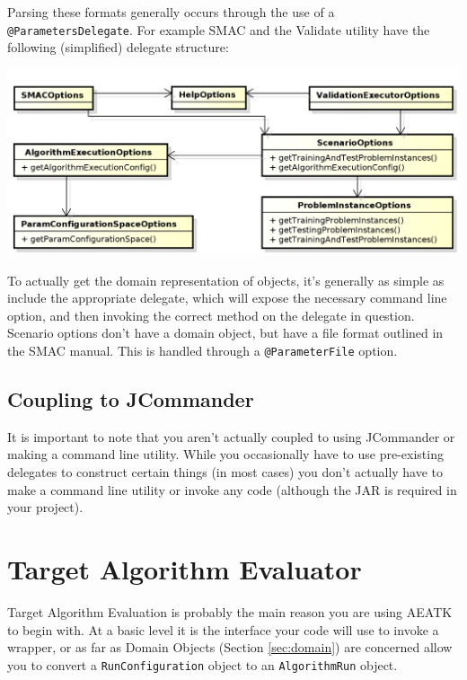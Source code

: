 \documentclass[11pt,letterpaper,oneside]{article}
\begin{document}
Parsing these formats generally occurs through the use of a \texttt{@ParametersDelegate}. For example SMAC and the Validate utility have the following (simplified) delegate structure:

\begin{center}
\includegraphics[scale=0.75]{img/UML/Options2.png}
\end{center}


To actually get the domain representation of objects, it's generally as simple as include the appropriate delegate, which will expose the necessary command line option, and then invoking the correct method on the delegate in question. Scenario options don't have a domain object, but have a file format outlined in the SMAC manual. This is handled through a \texttt{@ParameterFile} option.

\subsection{Coupling to JCommander}

It is important to note that you aren't actually coupled to using JCommander or making a command line utility. While you occasionally have to use pre-existing delegates to construct certain things (in most cases) you don't actually have to make a command line utility or invoke any code (although the JAR is required in your project).


\section{Target Algorithm Evaluator}
\label{sec:tae}
Target Algorithm Evaluation is probably the main reason you are using AEATK to begin with. At a basic level it is the interface your code will use to invoke a wrapper, or as far as Domain Objects (Section \ref{sec:domain}) are concerned allow you to convert a \texttt{RunConfiguration} object to an \texttt{AlgorithmRun} object.
\end{document}
